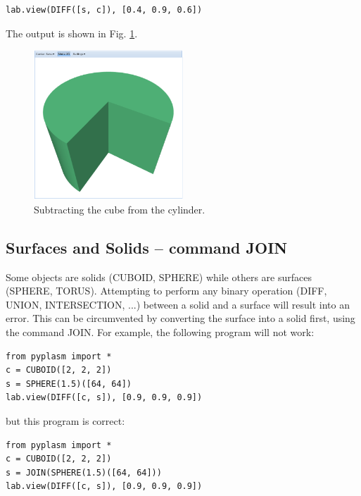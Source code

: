 \documentclass[article,A4,12pt]{llncs}
\begin{document}
\begin{verbatim}
lab.view(DIFF([s, c]), [0.4, 0.9, 0.6]) 
\end{verbatim}
The output is shown in Fig. \ref{fig:diff-2}.

\newpage

\begin{figure}[!ht]
\begin{center}
\includegraphics[width=0.5\textwidth]{img/diff-2.png}
\end{center}
\vspace{-2mm}
\caption{Subtracting the cube from the cylinder.}
\label{fig:diff-2}
\end{figure}
\noindent

\subsection{Surfaces and Solids -- command JOIN}

Some objects are solids (CUBOID, SPHERE) while others are surfaces (SPHERE, TORUS). 
Attempting to perform any binary operation (DIFF, UNION, INTERSECTION, ...) between
a solid and a surface will result into an error. This can be circumvented by 
converting the surface into a solid first, using the command JOIN. For example,
the following program will not work:

\begin{verbatim}
from pyplasm import *
c = CUBOID([2, 2, 2])
s = SPHERE(1.5)([64, 64])
lab.view(DIFF([c, s]), [0.9, 0.9, 0.9])
\end{verbatim}
but this program is correct:

\begin{verbatim}
from pyplasm import *
c = CUBOID([2, 2, 2])
s = JOIN(SPHERE(1.5)([64, 64]))
lab.view(DIFF([c, s]), [0.9, 0.9, 0.9])
\end{verbatim}
\end{document}
